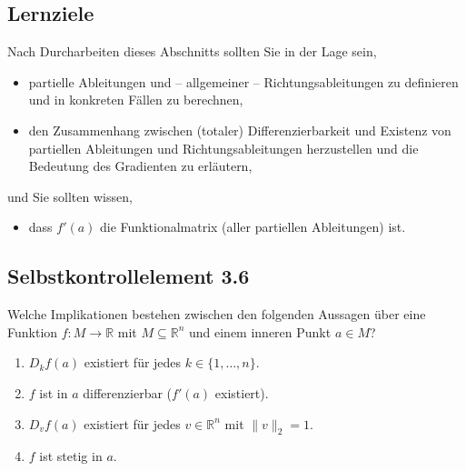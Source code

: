 \documentclass[a4paper,12pt]{article}
\begin{document}
\begin{center}
\end{center}

\subsection*{Lernziele}

Nach Durcharbeiten dieses Abschnitts sollten Sie in der Lage sein,
\begin{itemize}
  \item partielle Ableitungen und -- allgemeiner -- Richtungsableitungen zu
        definieren und in konkreten F\"allen zu berechnen,
  \item den Zusammenhang zwischen (totaler) Differenzierbarkeit und Existenz
        von partiellen Ableitungen und Richtungsableitungen herzustellen und
        die Bedeutung des Gradienten zu erl\"autern,
\end{itemize}
und Sie sollten wissen,
\begin{itemize}
  \item dass $f'(a)$ die Funktionalmatrix (aller partiellen Ableitungen) ist.
\end{itemize}

\subsection*{Selbstkontrollelement 3.6}

Welche Implikationen bestehen zwischen den folgenden Aussagen \"uber eine
Funktion $f : M \to \mathbb{R}$ mit $M \subseteq \mathbb{R}^n$ und einem
inneren Punkt $a \in M$?
\begin{enumerate}
  \item $D_k f(a)$ existiert f\"ur jedes $k \in \{1, \ldots, n\}$.
  \item $f$ ist in $a$ differenzierbar ($f'(a)$ existiert).
  \item $D_v f(a)$ existiert f\"ur jedes $v \in \mathbb{R}^n$ mit $\|v\|_2 = 1$.
  \item $f$ ist stetig in $a$.
\end{enumerate}
\end{document}
